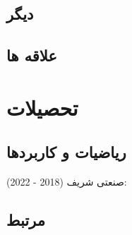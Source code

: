 \documentclass{article}
\begin{document}
\subsection{دیگر}
\subsubsection{}
\subsubsection{}
\subsection{علاقه ها}
\section{تحصیلات}
\subsection{ریاضیات و کاربردها}
صنعتی شریف (2018 - 2022):
\subsection{مرتبط}
\subsubsection{}
\subsubsection{}
\subsubsection{}
\end{document}
